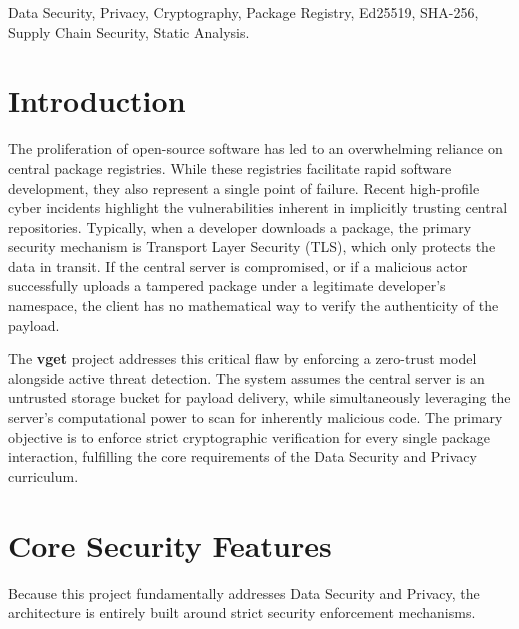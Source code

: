 \documentclass[conference]{IEEEtran}
\begin{document}
\begin{IEEEkeywords}
Data Security, Privacy, Cryptography, Package Registry, Ed25519, SHA-256, Supply Chain Security, Static Analysis.
\end{IEEEkeywords}

\section{Introduction}
The proliferation of open-source software has led to an overwhelming reliance on central package registries. While these registries facilitate rapid software development, they also represent a single point of failure. Recent high-profile cyber incidents \cite{ohm2020backstabber, ladisa2023taxonomy} highlight the vulnerabilities inherent in implicitly trusting central repositories. Typically, when a developer downloads a package, the primary security mechanism is Transport Layer Security (TLS), which only protects the data in transit. If the central server is compromised, or if a malicious actor successfully uploads a tampered package under a legitimate developer's namespace, the client has no mathematical way to verify the authenticity of the payload.

The \textbf{vget} project addresses this critical flaw by enforcing a zero-trust model alongside active threat detection. The system assumes the central server is an untrusted storage bucket for payload delivery, while simultaneously leveraging the server's computational power to scan for inherently malicious code. The primary objective is to enforce strict cryptographic verification for every single package interaction, fulfilling the core requirements of the Data Security and Privacy curriculum.

\section{Core Security Features}
Because this project fundamentally addresses Data Security and Privacy, the architecture is entirely built around strict security enforcement mechanisms.
\end{document}
